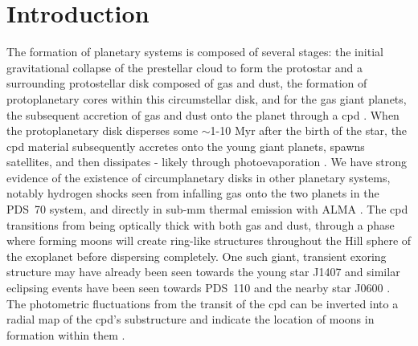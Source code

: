\documentclass[longauth]{aa} %
\begin{document}

   \maketitle
%

\section{Introduction}

The formation of planetary systems is composed of several stages: the initial gravitational collapse of the prestellar cloud to form the protostar and a surrounding protostellar disk composed of gas and dust, the formation of protoplanetary cores within this circumstellar disk, and for the gas giant planets, the subsequent accretion of gas and dust onto the planet through a \acf{cpd} \citep{Lubow99, Lambrechts12, Mordasini18}.
%
When the protoplanetary disk disperses some $\sim$1-10 Myr after the birth of the star, the \ac{cpd} material subsequently accretes onto the young giant planets, spawns satellites, and then dissipates - likely through photoevaporation \citep[e.g.][]{Mamajek09, Canup02, Oberg20}.
%
We have strong evidence of the existence of circumplanetary disks in other planetary systems, notably hydrogen shocks seen from infalling gas onto the two planets in the PDS~70 \citep{Keppler18,Haffert19} system, and directly in sub-mm thermal emission with ALMA \citep{Isella19}.
%
The \ac{cpd} transitions from being optically thick with both gas and dust, through a phase where forming moons will create ring-like structures throughout the Hill sphere of the exoplanet before dispersing completely.
%
One such giant, transient exoring structure may have already been seen towards the young star J1407 \citep[V1400 Cen;][]{Mamajek12, Kenworthy15} and similar eclipsing events have been seen towards PDS~110 \citep{Osborn17,Osborn19} and the nearby star J0600 \citep{Way19,Way19b}.
%
The photometric fluctuations from the transit of the \ac{cpd} can be inverted into a radial map of the \ac{cpd}'s substructure and  indicate the location of moons in formation within them \citep{Kenworthy15}.
\end{document}
